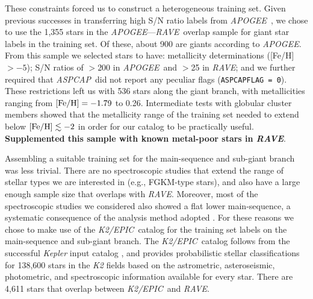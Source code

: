\documentclass[preprint,trackchanges]{aastex}
\newcommand{\acronym}[1]{{\small{#1}}}
\newcommand{\project}[1]{\textsl{#1}}
\newcommand{\rave}{\project{\acronym{RAVE}}}
\newcommand{\apogee}{\project{\acronym{APOGEE}}}
\newcommand{\aspcap}{\project{\acronym{ASPCAP}}}
\newcommand{\epic}{\project{K2/EPIC}}
\newcommand{\stub}[1]{{\color{blue} \textbf{#1}}}
\begin{document}
These constraints forced us to construct a heterogeneous training set.  Given previous
successes in transferring high S/N ratio labels from \apogee\ \citep{Ness_2015,
Ness_2016,Ho_2016,Casey_2016b}, we chose to use the 1,355 stars in the \apogee---\rave\ 
overlap sample for giant star labels in the training set.  Of these, about 900 are 
giants according to \apogee.  From this sample we selected stars to have: metallicity
determinations ([Fe/H] $> -5$); S/N ratios of $>$200 in \apogee\ and $>$25 in \rave; and 
we further required that \aspcap\ did not report any peculiar flags 
(\texttt{ASPCAPFLAG = 0}).  These restrictions left us with 536 stars along the giant 
branch, with metallicities ranging from $[{\rm Fe/H}] = -1.79$ to 0.26.  Intermediate 
tests with globular cluster members showed that the metallicity range of the training 
set needed to extend below $[{\rm Fe/H}] \lesssim -2$ in order for our catalog to be 
practically useful.  \stub{Supplemented this sample with known metal-poor stars in \rave}.



Assembling a suitable training set for the main-sequence and sub-giant branch was less
trivial.  There are no spectroscopic studies that extend the range of stellar types we 
are interested in (e.g., FGKM-type stars), and also have a large enough sample size that
overlaps with \rave.  Moreover, most of the spectroscopic studies we considered also 
showed a flat lower main-sequence, a systematic consequence of the analysis method adopted 
\citep[see][for discussion on this issue]{Bensby_2014}.  For these reasons we chose to make 
use of the \epic\ catalog \citep{Huber_2016} for the training set labels on the 
main-sequence and sub-giant branch.  The \epic\ catalog follows from the successful
\project{Kepler} input catalog \citep{Brown_2011}, and provides probabilistic stellar 
classifications for 138,600 stars in the \project{K2} fields based on the 
astrometric, asteroseismic, photometric, and spectroscopic information available for
every star.  There are 4,611 stars that overlap between \epic\ and \rave.
\end{document}
